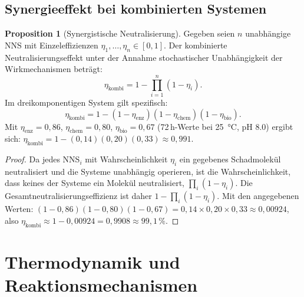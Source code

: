﻿\documentclass[12pt,a4paper]{article}
\theoremstyle{definition}
\newtheorem{proposition}{Proposition}[section]
\theoremstyle{remark}
\begin{document}
\subsection{Synergieeffekt bei kombinierten Systemen}

\begin{proposition}[Synergistische Neutralisierung]
\label{prop:synergie}
Gegeben seien $n$ unabhängige NNS mit Einzeleffizienzen
$\eta_1, \ldots, \eta_n \in [0,1]$. Der kombinierte Neutralisierungseffekt
unter der Annahme stochastischer Unabhängigkeit der Wirkmechanismen beträgt:
\begin{equation}
  \eta_{\text{kombi}} = 1 - \prod_{i=1}^{n}(1-\eta_i).
  \label{eq:synergie}
\end{equation}
Im dreikomponentigen System gilt spezifisch:
\begin{equation}
  \eta_{\text{kombi}} = 1 - (1-\eta_{\text{enz}})(1-\eta_{\text{chem}})(1-\eta_{\text{bio}}).
  \label{eq:synergie3}
\end{equation}
Mit $\eta_{\text{enz}} = 0{,}86$, $\eta_{\text{chem}} = 0{,}80$,
$\eta_{\text{bio}} = 0{,}67$ (72\,h-Werte bei 25\, °C, pH 8.0) ergibt sich:
$\eta_{\text{kombi}} = 1 - (0{,}14)(0{,}20)(0{,}33) \approx 0{,}991$.
\end{proposition}

\begin{proof}
Da jedes NNS$_i$ mit Wahrscheinlichkeit $\eta_i$ ein gegebenes Schadmolekül
neutralisiert und die Systeme unabhängig operieren, ist die Wahrscheinlichkeit,
dass keines der Systeme ein Molekül neutralisiert, $\prod_i(1-\eta_i)$.
Die Gesamtneutralisierungseffizienz ist daher $1 - \prod_i(1-\eta_i)$.
Mit den angegebenen Werten:
$(1-0{,}86)(1-0{,}80)(1-0{,}67) = 0{,}14 \times 0{,}20 \times 0{,}33
\approx 0{,}00924$, also
$\eta_{\text{kombi}} \approx 1 - 0{,}00924 = 0{,}9908 \approx 99{,}1\,\%$.\hfill
\end{proof}

\section{Thermodynamik und Reaktionsmechanismen}
\label{sec:mechanismen}
\end{document}
